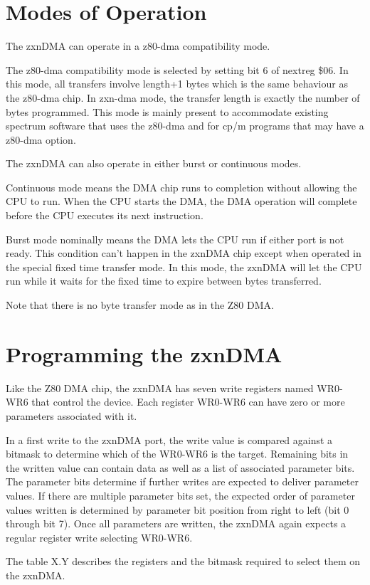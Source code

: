 \section{Modes of Operation}
The zxnDMA can operate in a z80-dma compatibility mode.

The z80-dma compatibility mode is selected by setting bit 6 of nextreg
\$06. In this mode, all transfers involve length+1 bytes which is the
same behaviour as the z80-dma chip. In zxn-dma mode, the transfer
length is exactly the number of bytes programmed. This mode is mainly
present to accommodate existing spectrum software that uses the
z80-dma and for cp/m programs that may have a z80-dma option.

The zxnDMA can also operate in either burst or continuous modes.

Continuous mode means the DMA chip runs to completion without allowing
the CPU to run. When the CPU starts the DMA, the DMA operation will
complete before the CPU executes its next instruction.

Burst mode nominally means the DMA lets the CPU run if either port is
not ready. This condition can't happen in the zxnDMA chip except when
operated in the special fixed time transfer mode. In this mode, the
zxnDMA will let the CPU run while it waits for the fixed time to
expire between bytes transferred.

Note that there is no byte transfer mode as in the Z80 DMA.

\section{Programming the zxnDMA}
Like the Z80 DMA chip, the zxnDMA has seven write registers named
WR0-WR6 that control the device. Each register WR0-WR6 can have zero
or more parameters associated with it.

In a first write to the zxnDMA port, the write value is compared
against a bitmask to determine which of the WR0-WR6 is the
target. Remaining bits in the written value can contain data as well
as a list of associated parameter bits. The parameter bits determine
if further writes are expected to deliver parameter values. If there
are multiple parameter bits set, the expected order of parameter
values written is determined by parameter bit position from right to
left (bit 0 through bit 7). Once all parameters are written, the
zxnDMA again expects a regular register write selecting WR0-WR6.

The table X.Y describes the registers and the bitmask required to
select them on the zxnDMA.

